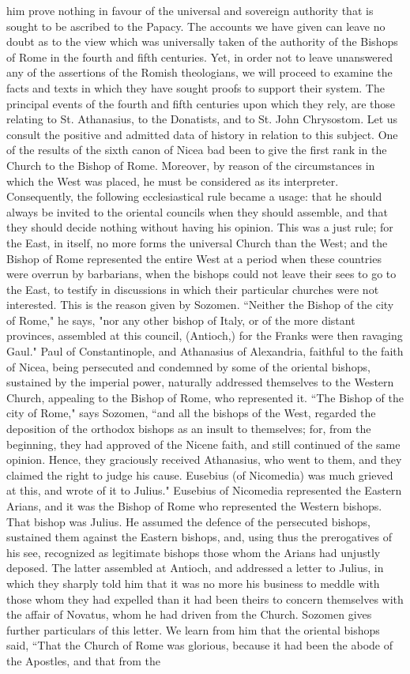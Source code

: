 him prove nothing in favour of the universal and sovereign authority that is sought to be ascribed to the Papacy. The accounts we have given can leave no doubt as to the view which was universally taken of the authority of the Bishops of Rome in the fourth and fifth centuries. Yet, in order not to leave unanswered any of the assertions of the Romish theologians, we will proceed to examine the facts and texts in which they have sought proofs to support their system. The principal events of the fourth and fifth centuries upon which they rely, are those relating to St. Athanasius, to the Donatists, and to St. John Chrysostom. Let us consult the positive and admitted data of history in relation to this subject. One of the results of the sixth canon of Nicea bad been to give the first rank in the Church to the Bishop of Rome. Moreover, by reason of the circumstances in which the West was placed, he must be considered as its interpreter. Consequently, the following ecclesiastical rule became a usage: that he should always be invited to the oriental councils when they should assemble, and that they should decide nothing without having his opinion. This was a just rule; for the East, in itself, no more forms the universal Church than the West; and the Bishop of Rome represented the entire West at a period when these countries were overrun by barbarians, when the bishops could not leave their sees to go to the East, to testify in discussions in which their particular churches were not interested. This is the reason given by Sozomen. “Neither the Bishop of the city of Rome," he says, "nor any other bishop of Italy, or of the more distant provinces, assembled at this council, (Antioch,) for the Franks were then ravaging Gaul." Paul of Constantinople, and Athanasius of Alexandria, faithful to the faith of Nicea, being persecuted and condemned by some of the oriental bishops, sustained by the imperial power, naturally addressed themselves to the Western Church, appealing to the Bishop of Rome, who represented it. “The Bishop of the city of Rome," says Sozomen, “and all the bishops of the West, regarded the deposition of the orthodox bishops as an insult to themselves; for, from the beginning, they had approved of the Nicene faith, and still continued of the same opinion. Hence, they graciously received Athanasius, who went to them, and they claimed the right to judge his cause. Eusebius (of Nicomedia) was much grieved at this, and wrote of it to Julius." Eusebius of Nicomedia represented the Eastern Arians, and it was the Bishop of Rome who represented the Western bishops. That bishop was Julius. He assumed the defence of the persecuted bishops, sustained them against the Eastern bishops, and, using thus the prerogatives of his see, recognized as legitimate bishops those whom the Arians had unjustly deposed. The latter assembled at Antioch, and addressed a letter to Julius, in which they sharply told him that it was no more his business to meddle with those whom they had expelled than it had been theirs to concern themselves with the affair of Novatus, whom he had driven from the Church. Sozomen gives further particulars of this letter. We learn from him that the oriental bishops said, “That the Church of Rome was glorious, because it had been the abode of the Apostles, and that from the 